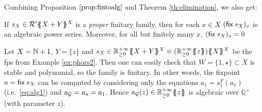   Combining Proposition  $\ref{prop:fintoalg}$ and Theorem  \ref{th:elimination},
  we also get:
   \begin{corollary}
   	\label{cor:propertoalg}

	
	
   		If $s_X\in {\mathcal{R}'}\{\!\!\{X+Y\}\!\!\}^X$ is a \textit{proper} finitary family, then for each $x \in X$  $(\mathsf{fix}\: s_X)_x$ is an algebraic power series. Moreover, for all but finitely many $x$, $(\mathsf{fix}\: s_X)_x=0$
   \end{corollary}


   
  \begin{example}
    Let $X=\mathbb{N}+1$, $Y=\{z\}$ and $s_X\in \fps{\Rinf}{X+Y}^X\equiv\fps{(\fps{\Rinf}{z})}{X}^{X}$ be the fps from Example \ref{ex:phors2}. 
  Then one can easily check that $W=\{1,\star\}\subset X$ is stable and polynomial, so the family is finitary. In other words, the fixpoint $a=\mathsf{fix}\: s_X$ can be computed by considering only the equations $a_1=s^F_1(a_1)$ (i.e.~\eqref{eq:alg1}) and $a_{\mathcal{G}}=a_{\star}=a_1$.
Hence $a_{\mathcal{G}}(z)\in {\mathbb{R}^{+\infty}_{\geq 0}}\{\!\!\{z\}\!\!\}$ is algebraic over $\mathbb Q^+$ (with parameter $z$).

    


  \end{example}



   

 